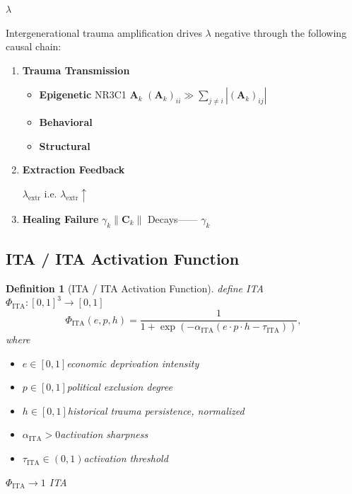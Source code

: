 \documentclass[11pt,a4paper]{article}
\newtheorem{definition}[theorem]{Definition}
\theoremstyle{remark}
\newcommand{\paren}[1]{\left(#1\right)}
\newcommand{\lambdaparam}{\lambda}
\begin{document}
 $\lambdaparam$ 

Intergenerational trauma amplification drives $\lambdaparam$ negative through the
following causal chain:

\begin{enumerate}
    \item \textbf{Trauma Transmission}
          
          \begin{itemize}
              \item \textbf{Epigenetic} 
                    NR3C1 
                    $\mathbf{A}_k$ $(\mathbf{A}_k)_{ii} \gg \sum_{j \neq i} |(\mathbf{A}_k)_{ij}|$
              \item \textbf{Behavioral} 
                    
              \item \textbf{Structural} 
                    
          \end{itemize}

    \item \textbf{Extraction Feedback}
          
           $\lambdaparam_{\text{extr}}$ 
          i.e. $\lambdaparam_{\text{extr}} \uparrow$ 

    \item \textbf{Healing Failure}
          $\gamma_k \|\mathbf{C}_k\|$ Decays——
          $\gamma_k$ 
\end{enumerate}

\subsection{ITA  / ITA Activation Function}

\begin{definition}[ITA  / ITA Activation Function]
\label{def:ITA_activation}
define ITA  $\Phi_{\text{ITA}}: [0,1]^3 \to [0,1]$
\[
\Phi_{\text{ITA}}(e, p, h) = \frac{1}{1 + \exp\paren{-\alpha_{\text{ITA}}(e \cdot p \cdot h - \tau_{\text{ITA}})}},
\]
where
\begin{itemize}
    \item $e \in [0,1]$economic deprivation intensity
    \item $p \in [0,1]$political exclusion degree
    \item $h \in [0,1]$historical trauma persistence, normalized
    \item $\alpha_{\text{ITA}} > 0$activation sharpness
    \item $\tau_{\text{ITA}} \in (0,1)$activation threshold
\end{itemize}
 $\Phi_{\text{ITA}} \to 1$ ITA 
\end{definition}
\end{document}
